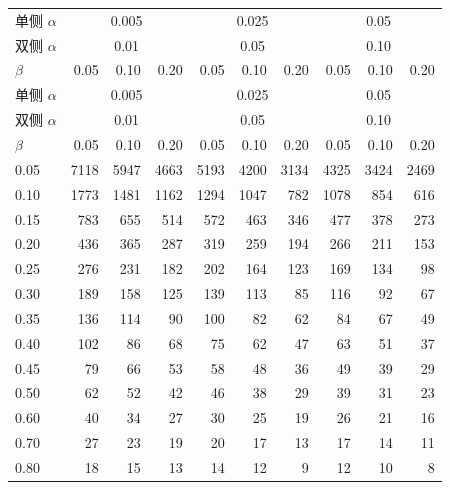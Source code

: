 {\small\setlength{\tabcolsep}{4pt}
\begin{longtable}{lrrrrrrrrr}
\toprule
单侧 $\alpha$ & \multicolumn{3}{c}{0.005} & \multicolumn{3}{c}{0.025} & \multicolumn{3}{c}{0.05}\\
双侧 $\alpha$ & \multicolumn{3}{c}{0.01} & \multicolumn{3}{c}{0.05} & \multicolumn{3}{c}{0.10}\\
$\beta$ & 0.05 & 0.10 & 0.20 & 0.05 & 0.10 & 0.20 & 0.05 & 0.10 & 0.20\\\midrule
\endfirsthead
\toprule
单侧 $\alpha$ & \multicolumn{3}{c}{0.005} & \multicolumn{3}{c}{0.025} & \multicolumn{3}{c}{0.05}\\
双侧 $\alpha$ & \multicolumn{3}{c}{0.01} & \multicolumn{3}{c}{0.05} & \multicolumn{3}{c}{0.10}\\
$\beta$ & 0.05 & 0.10 & 0.20 & 0.05 & 0.10 & 0.20 & 0.05 & 0.10 & 0.20\\\midrule
\endhead
0.05 & 7118 & 5947 & 4663 & 5193 & 4200 & 3134 & 4325 & 3424 & 2469\\
0.10 & 1773 & 1481 & 1162 & 1294 & 1047 & 782 & 1078 & 854 & 616\\
0.15 & 783 & 655 & 514 & 572 & 463 & 346 & 477 & 378 & 273\\
0.20 & 436 & 365 & 287 & 319 & 259 & 194 & 266 & 211 & 153\\
0.25 & 276 & 231 & 182 & 202 & 164 & 123 & 169 & 134 & 98\\
0.30 & 189 & 158 & 125 & 139 & 113 & 85 & 116 & 92 & 67\\
0.35 & 136 & 114 & 90 & 100 & 82 & 62 & 84 & 67 & 49\\
0.40 & 102 & 86 & 68 & 75 & 62 & 47 & 63 & 51 & 37\\
0.45 & 79 & 66 & 53 & 58 & 48 & 36 & 49 & 39 & 29\\
0.50 & 62 & 52 & 42 & 46 & 38 & 29 & 39 & 31 & 23\\
0.60 & 40 & 34 & 27 & 30 & 25 & 19 & 26 & 21 & 16\\
0.70 & 27 & 23 & 19 & 20 & 17 & 13 & 17 & 14 & 11\\
0.80 & 18 & 15 & 13 & 14 & 12 & 9 & 12 & 10 & 8\\\bottomrule
\end{longtable}}
